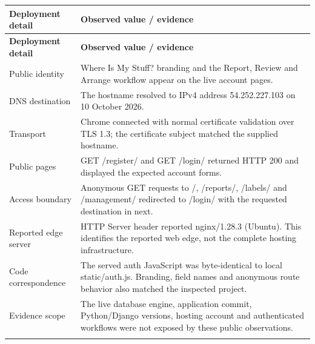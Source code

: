 \documentclass[12pt,a4paper,oneside]{report}
\begin{document}
\begin{longtable}{@{}P{0.27\dimexpr\textwidth-12pt\relax}P{0.73\dimexpr\textwidth-12pt\relax}@{}}

\toprule \textbf{Deployment detail} & \textbf{Observed value / evidence} \\ \midrule\endfirsthead

\toprule \textbf{Deployment detail} & \textbf{Observed value / evidence} \\ \midrule\endhead

\bottomrule\endfoot

Public identity & Where Is My Stuff? branding and the Report, Review and Arrange workflow appear on the live account pages. \\ \addlinespace[3pt]

DNS destination & The hostname resolved to IPv4 address 54.252.227.103 on 10 October 2026. \\ \addlinespace[3pt]

Transport & Chrome connected with normal certificate validation over TLS 1.3; the certificate subject matched the supplied hostname. \\ \addlinespace[3pt]

Public pages & GET /register/ and GET /login/ returned HTTP 200 and displayed the expected account forms. \\ \addlinespace[3pt]

Access boundary & Anonymous GET requests to /, /reports/, /labels/ and /management/ redirected to /login/ with the requested destination in next. \\ \addlinespace[3pt]

Reported edge server & HTTP Server header reported nginx/1.28.3 (Ubuntu). This identifies the reported web edge, not the complete hosting infrastructure. \\ \addlinespace[3pt]

Code correspondence & The served auth JavaScript was byte-identical to local static/auth.js. Branding, field names and anonymous route behavior also matched the inspected project. \\ \addlinespace[3pt]

Evidence scope & The live database engine, application commit, Python/Django versions, hosting account and authenticated workflows were not exposed by these public observations. \\ \addlinespace[3pt]

\end{longtable}
\end{document}
